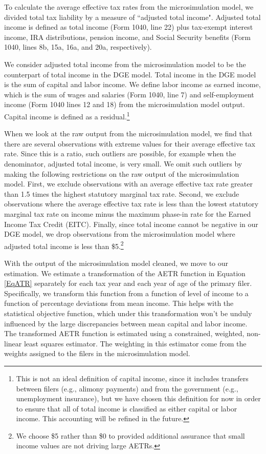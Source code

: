 \documentclass[letterpaper,12pt]{article}
\theoremstyle{definition}
\begin{document}
\begin{spacing}{1.5}
 To calculate the average effective tax rates from the microsimulation model, we divided total tax liability by a measure of ``adjusted total income".  Adjusted total income is defined as total income (Form 1040, line 22) plus tax-exempt interest income, IRA distributions, pension income, and Social Security benefits (Form 1040, lines 8b, 15a, 16a, and 20a, respectively).

 We consider adjusted total income from the microsimulation model to be the counterpart of total income in the DGE model.  Total income in the DGE model is the sum of capital and labor income.  We define labor income as earned income, which is the sum of wages and salaries (Form 1040, line 7) and self-employment income (Form 1040 lines 12 and 18) from the microsimulation model output.  Capital income is defined as a residual.\footnote{This is not an ideal definition of capital income, since it includes transfers between filers (e.g., alimony payments) and from the government (e.g., unemployment insurance), but we have chosen this definition for now in order to ensure that all of total income is classified as either capital or labor income. This accounting will be refined in the future.}

When we look at the raw output from the microsimulation model, we find that there are several observations with extreme values for their average effective tax rate.  Since this is a ratio, such outliers are possible, for example when the denominator, adjusted total income, is very small.  We omit such outliers by making the following restrictions on the raw output of the microsimulation model.  First, we exclude observations with an average effective tax rate greater than 1.5 times the highest statutory marginal tax rate.  Second, we exclude observations where the average effective tax rate is less than the lowest statutory marginal tax rate on income minus the maximum phase-in rate for the Earned Income Tax Credit (EITC).  Finally, since total income cannot be negative in our DGE model, we drop observations from the microsimulation model where adjusted total income is less than \$5.\footnote{We choose \$5 rather than \$0 to provided additional assurance that small income values are not driving large AETRs.}

With the output of the microsimulation model cleaned, we move to our estimation.  We estimate a transformation of the AETR function in Equation \ref{EqATR} separately for each tax year and each year of age of the primary filer.  Specifically, we transform this function from a function of level of income to a function of percentage deviations from mean income.  This helps with the statistical objective function, which under this transformation won't be unduly influenced by the large discrepancies between mean capital and labor income.  The transformed AETR function is estimated using a constrained, weighted, non-linear least squares estimator.  The weighting in this estimator come from the weights assigned to the filers in the microsimulation model.


\end{spacing}
\end{document}
